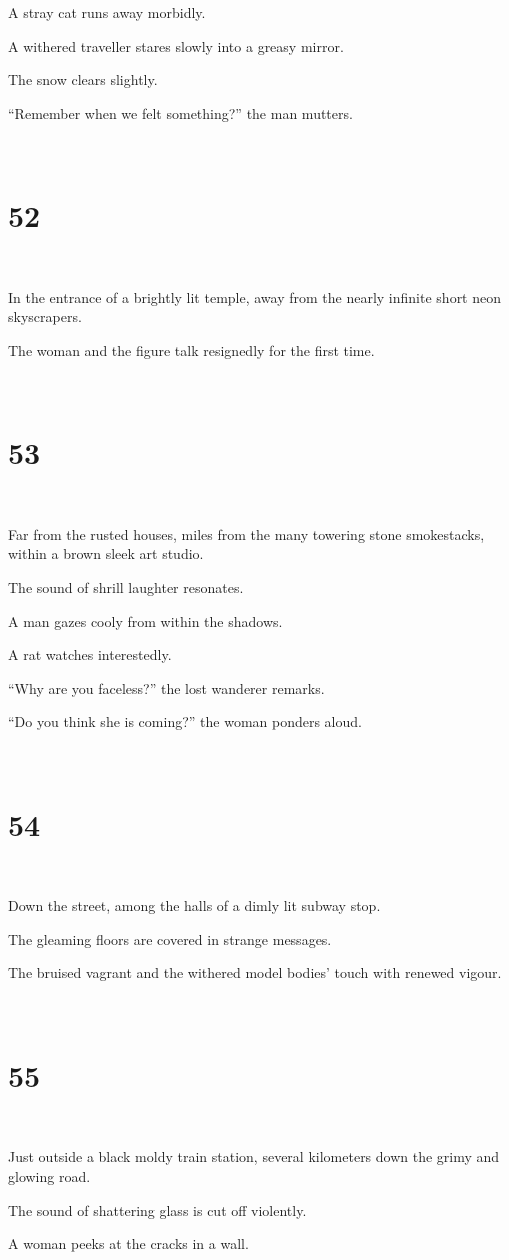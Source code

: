 \documentclass{report}
\begin{document}
A stray cat runs away morbidly.

A withered traveller stares slowly into a greasy mirror.

The snow clears slightly.

``Remember when we felt something?'' the man mutters.

~
\chapter*{52}
~

In the entrance of a brightly lit temple, away from the nearly infinite short neon skyscrapers.

The woman and the figure talk resignedly for the first time.

~
\chapter*{53}
~

Far from the rusted houses, miles from the many towering stone smokestacks, within a brown sleek art studio.

The sound of shrill laughter resonates.

A man gazes cooly from within the shadows.

A rat watches interestedly.

``Why are you faceless?'' the lost wanderer remarks.

``Do you think she is coming?'' the woman ponders aloud.

~
\chapter*{54}
~

Down the street, among the halls of a dimly lit subway stop.

The gleaming floors are covered in strange messages.

The bruised vagrant and the withered model bodies' touch with renewed vigour.

~
\chapter*{55}
~

Just outside a black moldy train station, several kilometers down the grimy and glowing road.

The sound of shattering glass is cut off violently.

A woman peeks at the cracks in a wall.
\end{document}
